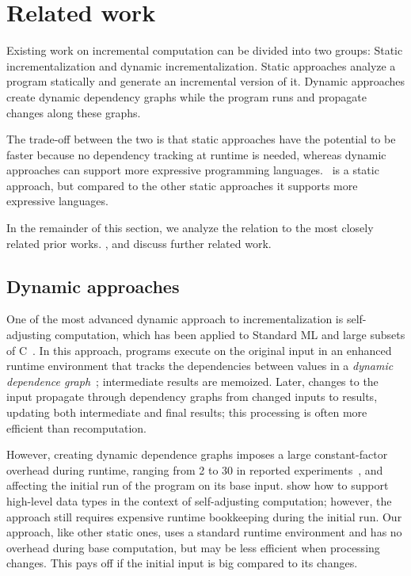 \chapter{Related work}
\label{sec:rw}

Existing work on incremental computation can be divided into two
groups: Static incrementalization and dynamic incrementalization.
Static approaches analyze a program statically and generate an incremental
version of it. Dynamic approaches create dynamic dependency graphs while
the program runs and propagate changes along these graphs.

The trade-off between the two is that static approaches have the potential
to be faster because no dependency tracking at runtime is needed, whereas
dynamic approaches can support more expressive programming languages.
%
\ILC\ is a static approach, but compared to the other static
approaches it supports more expressive languages.

In the remainder of this section, we analyze the relation to the
most closely related prior works. , \citet{Gupta99MMV}
and \citet{Acar06} discuss further related work.


\section{Dynamic approaches}
One of the most advanced dynamic approach to incrementalization is
self-adjusting computation, which has been applied to Standard ML
and large subsets of C~\citep{Acar09,Hammer11}.
In this approach, programs execute on the original
input in an enhanced runtime environment that tracks the
dependencies between values in a \emph{dynamic
  dependence graph}~\citep{Acar06}; intermediate results are
memoized.
Later, changes to the input propagate through
dependency graphs from changed inputs to results,
updating both intermediate and final results;
this processing is often more efficient than recomputation.

However, creating dynamic
dependence graphs imposes a large constant-factor overhead during
runtime, ranging from 2 to 30 in reported
experiments~\citep{Acar09EAS,Acar10TDT}, and affecting the
initial run of the program on its base input.
\citet{Acar10TDT} show how to support high-level data
types in the context of self-adjusting computation; however, the
approach still requires expensive runtime bookkeeping during the initial run.
Our approach, like other static ones, uses a standard runtime
environment and has no overhead
during base computation, but may be less efficient when processing
changes. This pays off if the initial input is 
big compared to its changes.


